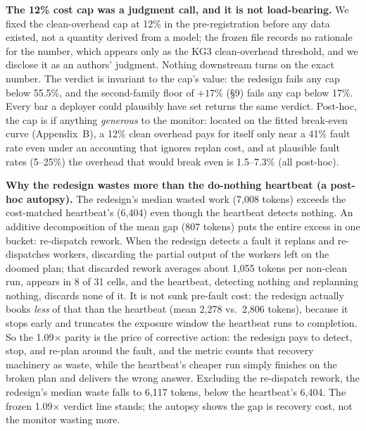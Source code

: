 \documentclass[acmsmall,screen]{acmart}
\begin{document}
\textbf{The 12\% cost cap was a judgment call, and it is not load-bearing.} We fixed
the clean-overhead cap at 12\% in the pre-registration before any data existed, not a
quantity derived from a model; the frozen file records no rationale for the number,
which appears only as the KG3 clean-overhead threshold, and we disclose it as an
authors' judgment. Nothing downstream turns on the exact number. The verdict is invariant to the cap's value: the
redesign fails any cap below 55.5\%, and the second-family floor of $+17\%$ (\S9) fails
any cap below 17\%. Every bar a deployer could plausibly have set returns the same
verdict. Post-hoc, the cap is if anything \emph{generous} to the monitor: located on the
fitted break-even curve (Appendix~B), a 12\% clean overhead pays for itself only near a
41\% fault rate even under an accounting that ignores replan cost, and at plausible fault
rates (5--25\%) the overhead that would break even is 1.5--7.3\% (all post-hoc).

\textbf{Why the redesign wastes more than the do-nothing heartbeat (a post-hoc autopsy).}
The redesign's median wasted work (7,008 tokens) exceeds the cost-matched heartbeat's
(6,404) even though the heartbeat detects nothing. An additive decomposition of the mean
gap (807 tokens) puts the entire excess in one bucket: re-dispatch rework. When the
redesign detects a fault it replans and re-dispatches workers, discarding the partial
output of the workers left on the doomed plan; that discarded rework averages about 1,055
tokens per non-clean run, appears in 8 of 31 cells, and the heartbeat, detecting nothing
and replanning nothing, discards none of it. It is not sunk pre-fault cost: the redesign
actually books \emph{less} of that than the heartbeat (mean 2,278 vs.\ 2,806 tokens),
because it stops early and truncates the exposure window the heartbeat runs to completion.
So the 1.09$\times$ parity is the price of corrective action: the redesign pays to detect,
stop, and re-plan around the fault, and the metric counts that recovery machinery as waste,
while the heartbeat's cheaper run simply finishes on the broken plan and delivers the wrong
answer. Excluding the re-dispatch rework, the redesign's median waste falls to 6,117 tokens,
below the heartbeat's 6,404. The frozen 1.09$\times$ verdict line stands; the autopsy shows
the gap is recovery cost, not the monitor wasting more.
\end{document}
